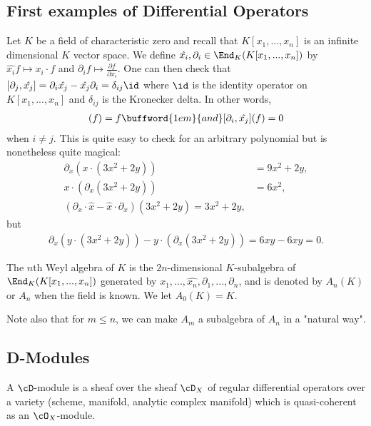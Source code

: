 \subsection{First examples of Differential Operators}
\begin{example}\label{exp:Weyl-algebra}
	Let $K$ be a field of characteristic zero and recall that $K[x_1,...,x_n]$ is an infinite dimensional $K$ vector space. We define $\hat{x_i}, \partial_i \in \End_K(K[x_1,...,x_n])$ by $\hat{x_i} f \mapsto x_i\cdot f$ and $\partial_i f \mapsto \frac{\partial f}{\partial x_i}$. One can then check that $[\partial_j, \hat{x_j}] = \partial_i \hat{x_j} - \hat{x_j}\partial_i = \delta_{ij}\id$ where $\id$ is the identity operator on $K[x_1,...,x_n]$ and $\delta_{ij}$ is the Kronecker delta. In other words,
	\begin{align*}
		[\partial_i,\hat{x_i}](f) = f \buffword{1em}{and} [\partial_i,\hat{x_j}](f) = 0
	\end{align*}
	when $i \neq j$. This is quite easy to check for an arbitrary polynomial but is nonetheless quite magical:
	\begin{align*}
		\partial_x \left(x\cdot (3x^2 + 2y)\right) &= 9x^2 + 2y, \\
		x \cdot \left(\partial_x(3x^2 + 2y)\right) &= 6x^2, \\
		(\partial_x \cdot \hat{x} - \hat{x}\cdot \partial_x)(3x^2 + 2y) = 3x^2 + 2y,
	\end{align*}
	but
	\begin{align*}
		\partial_x \left(y\cdot(3x^2 + 2y)\right) - y\cdot \left(\partial_x(3x^2 + 2y)\right) = 6xy - 6xy = 0.
	\end{align*}
	\begin{defn}\label{def:Weyl-alg}
		The $n$th Weyl algebra of $K$ is the $2n$-dimensional $K$-subalgebra of $\End_K(K[x_1,...,x_n])$ generated by $\hat{x_1},...,\hat{x_n},\partial_1,...,\partial_n$, and is denoted by $A_n(K)$ or $A_n$ when the field is known. We let $A_0(K) = K$.

		Note also that for $m \leq n$, we can make $A_m$ a subalgebra of $A_n$ in a "natural way".
	\end{defn}
\end{example}

\subsection{D-Modules}
\begin{defn}\label{def:D-modules}
	A $\cD$-module is a sheaf over the sheaf $\cD_X$ of regular differential operators over a variety (scheme, manifold, analytic complex manifold) which is quasi-coherent as an $\cO_X$-module.
\end{defn}


